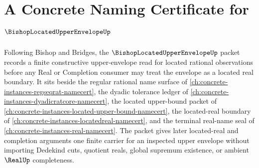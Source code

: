 \chapter{A Concrete Naming Certificate for $\BishopLocatedUpperEnvelopeUp$}
\label{ch:concrete-instances-bishop-located-upper-envelope-namecert}

Following Bishop and Bridges, the $\BishopLocatedUpperEnvelopeUp$ packet records a finite constructive upper-envelope read for located rational observations before any Real or Completion consumer may treat the envelope as a located real boundary. It sits beside the regular rational name surface of \autoref{ch:concrete-instances-regseqrat-namecert}, the dyadic tolerance ledger of \autoref{ch:concrete-instances-dyadicratcore-namecert}, the located upper-bound packet of \autoref{ch:concrete-instances-located-upper-bound-namecert}, the located-real boundary of \autoref{ch:concrete-instances-locatedreal-namecert}, and the terminal real-name seal of \autoref{ch:concrete-instances-real-namecert}. The packet gives later located-real and completion arguments one finite carrier for an inspected upper envelope without importing Dedekind cuts, quotient reals, global supremum existence, or ambient $\RealUp$ completeness.

